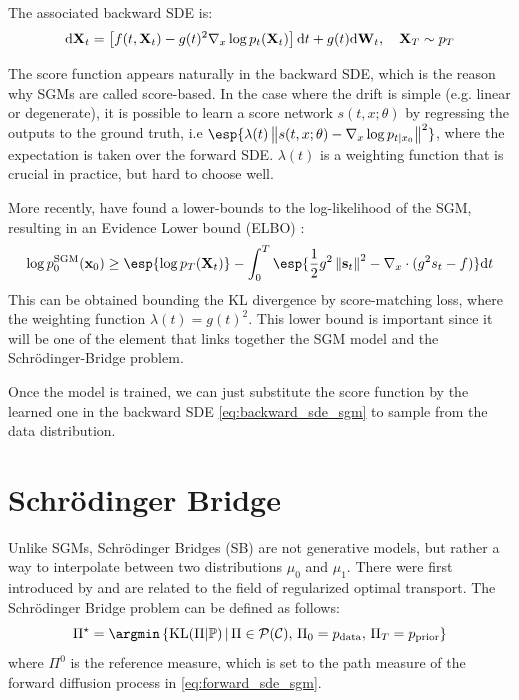 \documentclass{article}
\begin{document}
The associated backward SDE is:
\begin{equation}
    \mathrm{d}{\mathbf{X}_t} = \left\lbrack f(t,\mathbf{X}_t) - g(t)^2\nabla_x\log p_t(\mathbf{X}_t) \right\rbrack\mathrm{d}{t} + g(t) \mathrm{d}{\mathbf{W}_t}, \quad \mathbf{X}_T \sim p_T
    \label{eq:backward_sde_sgm}
\end{equation}

The score function appears naturally in the backward SDE, which is the reason why SGMs are called score-based. In the case where the drift is simple (e.g. linear or degenerate), it is possible to learn a score network $s(t, x; \theta)$ by regressing the outputs to the ground truth, i.e $\esp{\lambda(t) \norme{s(t, x; \theta) - \nabla_x \log p_{t|x_0}}^2}$, where the expectation is taken over the forward SDE.
$\lambda(t)$ is a weighting function that is crucial in practice, but hard to choose well.

More recently, \citet{song2021maximum} have found a lower-bounds to the log-likelihood of the SGM, resulting in an Evidence Lower bound (ELBO) :
\begin{equation}
\label{eq:sgm_logl}
\log p_0^\mathrm{SGM}(\mathbf{x}_0)
\ge
\esp{\log p_T(\mathbf{X}_t)}
- \int_0^T
\esp{\frac{1}{2}g^2\norme{\mathbf{s}_t}^2
- \nabla_x \cdot (g^2 s_t - f)}
\dint t
\end{equation}
This can be obtained bounding the KL divergence by score-matching loss, where the weighting function $\lambda(t) = g(t)^2$.
This lower bound is important since it will be one of the element that links together the SGM model and the Schrödinger-Bridge problem.

Once the model is trained, we can just substitute the score function by the learned one in the backward SDE \eqref{eq:backward_sde_sgm} to sample from the data distribution.




\section{Schrödinger Bridge}

Unlike SGMs, Schrödinger Bridges (SB) are not generative models, but rather a way to interpolate between two distributions $\mu_0$ and $\mu_1$.
There were first introduced by \citet{schrodinger1932theorie} and are related to the field of regularized optimal transport.
The Schrödinger Bridge problem can be defined as follows:
\begin{equation*}
    \Pi^\star = \argmin\braces{\mathrm{KL}(\Pi|\mathbb{P}) \, | \, \Pi \in \mathcal{P}(\mathcal{C}), \, \Pi_0 = p_{\textrm{data}}, \, \Pi_T = p_{\textrm{prior}}}
\end{equation*}
where $\Pi^0$ is the reference measure, which is set to the path measure of the forward diffusion process in \eqref{eq:forward_sde_sgm}.
\end{document}

